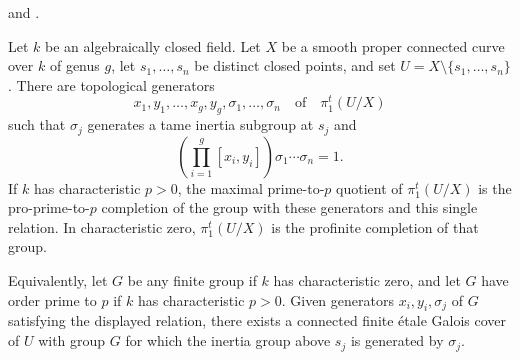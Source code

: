 \begin{proposition}
\label{proposition-tame-fundamental-group-punctured-curve}
\begin{reference}
\cite[Expos\'e 182, Corollaire sans num\'ero, pp. 219--220]{FGA} and
\cite[Expos\'e XIII, Corollaire 2.12]{SGA1}.
\end{reference}
Let $k$ be an algebraically closed field. Let $X$ be a smooth proper
connected curve over $k$ of genus $g$, let $s_1, \ldots, s_n$ be distinct
closed points, and set $U = X \setminus \{s_1, \ldots, s_n\}$. There are
topological generators
$$
x_1, y_1, \ldots, x_g, y_g, \sigma_1, \ldots, \sigma_n
\quad\text{of}\quad \pi_1^t(U/X)
$$
such that $\sigma_j$ generates a tame inertia subgroup at $s_j$ and
$$
\left(\prod_{i = 1}^g [x_i, y_i]\right)
\sigma_1 \cdots \sigma_n = 1.
$$
If $k$ has characteristic $p > 0$, the maximal prime-to-$p$ quotient of
$\pi_1^t(U/X)$ is the pro-prime-to-$p$ completion of the group with these
generators and this single relation. In characteristic zero,
$\pi_1^t(U/X)$ is the profinite completion of that group.

Equivalently, let $G$ be any finite group if $k$ has characteristic zero,
and let $G$ have order prime to $p$ if $k$ has characteristic $p > 0$.
Given generators
$x_i, y_i, \sigma_j$ of $G$ satisfying the displayed relation, there exists
a connected finite \'etale Galois cover of $U$ with group $G$ for which the
inertia group above $s_j$ is generated by $\sigma_j$.
\end{proposition}

